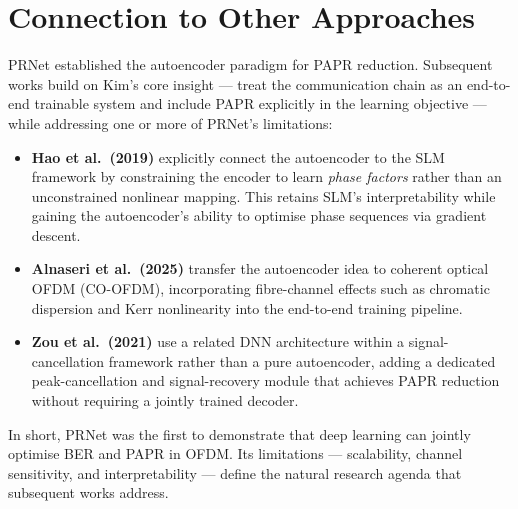 \section{Connection to Other Approaches}

PRNet established the autoencoder paradigm for PAPR reduction.  Subsequent works build on Kim's core insight --- treat the communication chain as an end-to-end trainable system and include PAPR explicitly in the learning objective --- while addressing one or more of PRNet's limitations:

\begin{itemize}
    \item \textbf{Hao et al.\ (2019)} explicitly connect the autoencoder to the SLM framework by constraining the encoder to learn \emph{phase factors} rather than an unconstrained nonlinear mapping.  This retains SLM's interpretability while gaining the autoencoder's ability to optimise phase sequences via gradient descent.
    \item \textbf{Alnaseri et al.\ (2025)} transfer the autoencoder idea to coherent optical OFDM (CO-OFDM), incorporating fibre-channel effects such as chromatic dispersion and Kerr nonlinearity into the end-to-end training pipeline.
    \item \textbf{Zou et al.\ (2021)} use a related DNN architecture within a signal-cancellation framework rather than a pure autoencoder, adding a dedicated peak-cancellation and signal-recovery module that achieves PAPR reduction without requiring a jointly trained decoder.
\end{itemize}

In short, PRNet was the first to demonstrate that deep learning can jointly optimise BER and PAPR in OFDM.  Its limitations --- scalability, channel sensitivity, and interpretability --- define the natural research agenda that subsequent works address.
